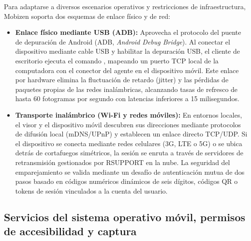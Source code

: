 \documentclass[12pt]{article}
\begin{document}
Para adaptarse a diversos escenarios operativos y restricciones de infraestructura, Mobizen soporta dos esquemas de enlace físico y de red:
\begin{itemize}[noitemsep, topsep=4pt]
    \item \textbf{Enlace físico mediante USB (ADB):} Aprovecha el protocolo del puente de depuración de Android (ADB, \textit{Android Debug Bridge}). Al conectar el dispositivo mediante cable USB y habilitar la depuración USB, el cliente de escritorio ejecuta el comando , mapeando un puerto TCP local de la computadora con el conector del agente en el dispositivo móvil. Este enlace por hardware elimina la fluctuación de retardo (jitter) y las pérdidas de paquetes propias de las redes inalámbricas, alcanzando tasas de refresco de hasta 60 fotogramas por segundo con latencias inferiores a 15 milisegundos.
    \item \textbf{Transporte inalámbrico (Wi-Fi y redes móviles):} En entornos locales, el visor y el dispositivo móvil descubren sus direcciones mediante protocolos de difusión local (mDNS/UPnP) y establecen un enlace directo TCP/UDP. Si el dispositivo se conecta mediante redes celulares (3G, LTE o 5G) o se ubica detrás de cortafuegos simétricos, la sesión se enruta a través de servidores de retransmisión gestionados por RSUPPORT en la nube. La seguridad del emparejamiento se valida mediante un desafío de autenticación mutua de dos pasos basado en códigos numéricos dinámicos de seis dígitos, códigos QR o tokens de sesión vinculados a la cuenta del usuario.
\end{itemize}

\subsection{Servicios del sistema operativo móvil, permisos de accesibilidad y captura}\label{sec:mobizenServiciosSo}
\end{document}
